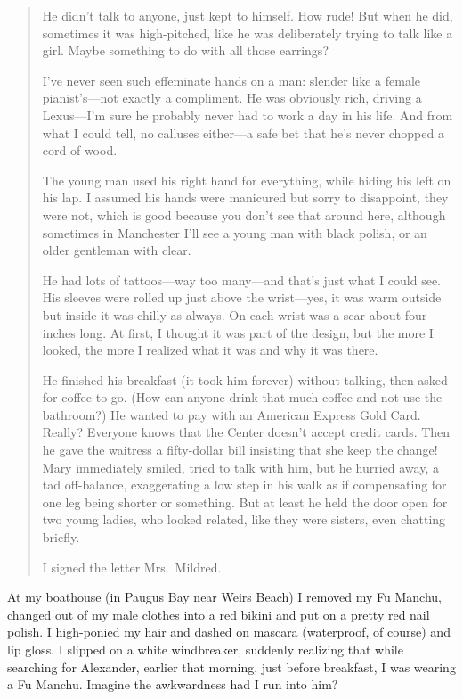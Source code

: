 \begin{quote}
He didn't talk to anyone, just kept to himself. How rude! But when he
did, sometimes it was high-pitched, like he was deliberately trying to
talk like a girl. Maybe something to do with all those earrings?

I've never seen such effeminate hands on a man: slender like a female
pianist's---not exactly a compliment. He was obviously rich, driving a
Lexus---I'm sure he probably never had to work a day in his life. And
from what I could tell, no calluses either---a safe bet that he's never
chopped a cord of wood.

The young man used his right hand for everything, while hiding his left
on his lap. I assumed his hands were manicured but sorry to disappoint,
they were not, which is good because you don't see that around here,
although sometimes in Manchester I'll see a young man with black polish,
or an older gentleman with clear.

He had lots of tattoos---way too many---and that's just what I could
see. His sleeves were rolled up just above the wrist---yes, it was warm
outside but inside it was chilly as always. On each wrist was a scar
about four inches long. At first, I thought it was part of the design,
but the more I looked, the more I realized what it was and why it was
there.

He finished his breakfast (it took him forever) without talking, then
asked for coffee to go. (How can anyone drink that much coffee and not
use the bathroom?) He wanted to pay with an American Express Gold Card.
Really? Everyone knows that the Center doesn't accept credit cards. Then
he gave the waitress a fifty-dollar bill insisting that she keep the
change! Mary immediately smiled, tried to talk with him, but he hurried
away, a tad off-balance, exaggerating a low step in his walk as if
compensating for one leg being shorter or something. But at least he
held the door open for two young ladies, who looked related, like they
were sisters, even chatting briefly.

I signed the letter Mrs.~Mildred.
\end{quote}

\noindent At my boathouse (in Paugus Bay near Weirs Beach) I removed my
Fu Manchu, changed out of my male clothes into a red bikini and put on a
pretty red nail polish. I high-ponied my hair and dashed on mascara
(waterproof, of course) and lip gloss. I slipped on a white windbreaker,
suddenly realizing that while searching for Alexander, earlier that
morning, just before breakfast, I was wearing a Fu Manchu. Imagine the
awkwardness had I run into him?


